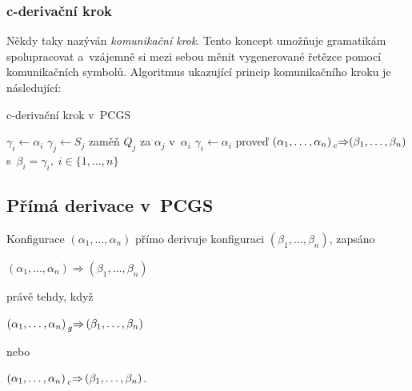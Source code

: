 \subsubsection*{c-derivační krok}\label{kap_c_der_krok}
Někdy taky nazýván \emph{komunikační krok}. Tento koncept umožňuje gramatikám spolupracovat a~vzájemně si mezi sebou měnit vygenerované řetězce pomocí komunikačních symbolů.
Algoritmus ukazující princip komunikačního kroku je následující:
\begin{algorithm}[h]
    \caption{c-derivační krok v~PCGS}
    \label{alg_c_der_krok}
    \begin{algorithmic}[1]
        \NewLine

            \State $\gamma_i \gets \alpha_i$
        \EndFor 
                    \State $\gamma_j \gets S_j$
                    \State zaměň $Q_j$ za $\alpha_j$ v~$\alpha_i$
                    \State $\gamma_i \gets \alpha_i$ 
                \EndFor
            \EndIf
        \EndFor
        \State proveď $(\alpha_1, \ldots, \alpha_n) \prescript{}{c}{\Rightarrow} (\beta_1, \ldots, \beta_n)$ s~$\beta_i = \gamma_i,\;i \in \{1, \ldots, n\}$ 
    \end{algorithmic}
\end{algorithm}

\subsection*{Přímá derivace v~PCGS}
\begin{definition}
    Konfigurace $(\alpha_1, \ldots, \alpha_n)$ přímo derivuje konfiguraci $(\beta_1, \ldots, \beta_n)$, zapsáno
    \begin{center}
        $(\alpha_1, \ldots, \alpha_n) \Rightarrow (\beta_1, \ldots, \beta_n)$
    \end{center} 
    právě tehdy, když
    \begin{center}
        $(\alpha_1, \ldots, \alpha_n) \prescript{}{g}{\Rightarrow}\, (\beta_1, \ldots, \beta_n)$
    \end{center}
    nebo
    \begin{center}
        $(\alpha_1, \ldots, \alpha_n) \prescript{}{c}{\Rightarrow}\, (\beta_1, \ldots, \beta_n)$.
    \end{center}
\end{definition}

